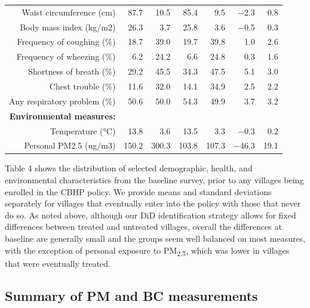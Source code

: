 \documentclass[
  letterpaper,
  DIV=11,
  numbers=noendperiod]{scrartcl}
\makeatletter
\renewenvironment{table}%
   {\renewcommand\familydefault\sfdefault
    \@float{table}}
   {\end@float}
\makeatother
\begin{document}
\begin{table}
\begin{tabular}[t]{rrrrrrr}
Waist circumference (cm) & \num{87.7} & \num{10.5} & \num{85.4} & \num{9.5} & \num{-2.3} & \num{0.8}\\
Body mass index (kg/m2) & \num{26.3} & \num{3.7} & \num{25.8} & \num{3.6} & \num{-0.5} & \num{0.3}\\
Frequency of coughing (\%) & \num{18.7} & \num{39.0} & \num{19.7} & \num{39.8} & \num{1.0} & \num{2.6}\\
Frequency of wheezing (\%) & \num{6.2} & \num{24.2} & \num{6.6} & \num{24.8} & \num{0.3} & \num{1.6}\\
Shortness of breath (\%) & \num{29.2} & \num{45.5} & \num{34.3} & \num{47.5} & \num{5.1} & \num{3.0}\\
Chest trouble (\%) & \num{11.6} & \num{32.0} & \num{14.1} & \num{34.9} & \num{2.5} & \num{2.2}\\
Any respiratory problem (\%) & \num{50.6} & \num{50.0} & \num{54.3} & \num{49.9} & \num{3.7} & \num{3.2}\\
\textbf{Environmental measures:} & \textbf{} & \textbf{} & \textbf{} & \textbf{} & \textbf{} & \textbf{}\\
Temperature (°C) & \num{13.8} & \num{3.6} & \num{13.5} & \num{3.3} & \num{-0.3} & \num{0.2}\\
Personal PM2.5 (ug/m3) & \num{150.2} & \num{300.3} & \num{103.8} & \num{107.3} & \num{-46.3} & \num{19.1}\\
\bottomrule
\end{tabular}
\end{table}

Table 4 shows the distribution of selected demographic, health, and
environmental characteristics from the baseline survey, prior to any
villages being enrolled in the CBHP policy. We provide means and
standard deviations separately for villages that eventually enter into
the policy with those that never do so. As noted above, although our DiD
identification strategy allows for fixed differences between treated and
untreated villages, overall the differences at baseline are generally
small and the groups seem well balanced on most measures, with the
exception of personal exposure to PM\textsubscript{2.5}, which was lower
in villages that were eventually treated.

\subsection{Summary of PM and BC
measurements}\label{summary-of-pm-and-bc-measurements}
\end{document}
